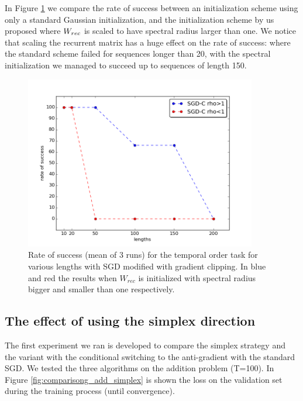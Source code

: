 In Figure \ref{fig:temporal_rates} we compare the rate of success between an initialization scheme using only a standard Gaussian initialization, and the initialization scheme by us proposed where $W_{rec}$ is scaled to have spectral radius larger than one. We notice that scaling the recurrent matrix has a huge effect on the rate of success: where the standard scheme failed for sequences longer than 20, with the spectral initialization we managed to succeed up to sequences of length 150.

\begin{figure}
	\centering
	\includegraphics[width= 0.9\textwidth]{chapter4/temporal_rates.png}
	\caption{Rate of success (mean of 3 runs) for the temporal order task for various lengths with SGD modified with gradient clipping. In blue and red the results when $W_{rec}$ is initialized with spectral radius bigger and smaller than one respectively.}
	\label{fig:temporal_rates}
\end{figure}



\subsection{The effect of using the simplex direction}
The first experiment we ran is developed to compare the simplex strategy and the variant with the conditional switching to the anti-gradient with the standard SGD. We tested the three algorithms on the addition problem (T=100). In Figure \ref{fig:comparisong_add_simplex} is shown the loss on the validation set during the training process (until convergence). 

